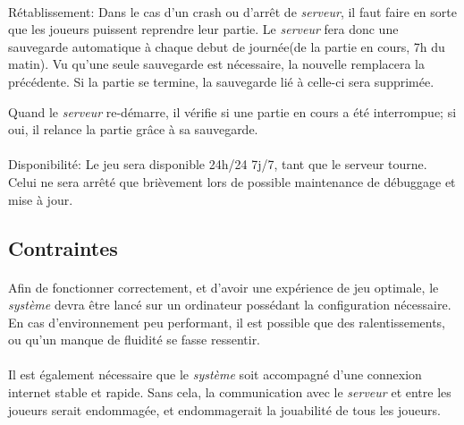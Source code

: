 \documentclass[a4paper,11pt]{report}
\begin{document}
\paragraph{}Rétablissement:  \newline
Dans le cas d'un crash ou d'arrêt de \textit{serveur}, il faut faire en sorte que les joueurs puissent reprendre leur partie. Le \textit{serveur} fera donc une sauvegarde automatique à chaque debut de journée(de la partie en cours, 7h du matin). 
Vu qu'une seule sauvegarde est nécessaire, la nouvelle remplacera la précédente.
Si la partie se termine, la sauvegarde lié à celle-ci sera supprimée.

Quand le \textit{serveur} re-démarre, il vérifie si une partie en cours a été interrompue; si oui, il relance la partie grâce à sa sauvegarde.

\paragraph{}Disponibilité:  \newline
Le jeu sera disponible 24h/24 7j/7, tant que le serveur tourne. Celui ne sera arrêté que brièvement lors de possible maintenance de débuggage et mise à jour.

\subsection{Contraintes}
\paragraph{}
Afin de fonctionner correctement, et d’avoir une expérience de jeu optimale, le \textit{système} devra être lancé sur un ordinateur possédant la configuration nécessaire.
En cas d’environnement peu performant, il est possible que des ralentissements, ou qu’un manque de fluidité se fasse ressentir.
\paragraph{}
Il est également nécessaire que le \textit{système} soit accompagné d’une connexion internet stable et rapide.
Sans cela, la communication avec le \textit{serveur} et entre les joueurs serait endommagée, et endommagerait la jouabilité de tous les joueurs.
\end{document}
